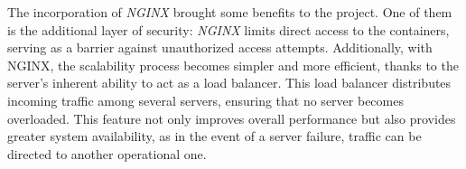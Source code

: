 The incorporation of \textit{NGINX} brought some benefits to the project. One of them is the additional layer of security: \textit{NGINX} limits direct access to the containers, serving as a barrier against unauthorized access attempts. Additionally, with NGINX, the scalability process becomes simpler and more efficient, thanks to the server's inherent ability to act as a load balancer. This load balancer distributes incoming traffic among several servers, ensuring that no server becomes overloaded. This feature not only improves overall performance but also provides greater system availability, as in the event of a server failure, traffic can be directed to another operational one.